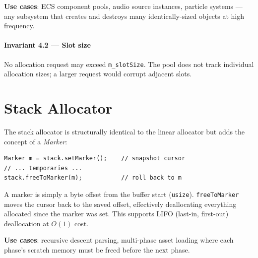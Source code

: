 \textbf{Use cases}: ECS component pools, audio source instances,
particle systems --- any subsystem that creates and destroys many
identically-sized objects at high frequency.


\paragraph{Invariant 4.2 --- Slot size}

  No allocation request may exceed \texttt{m\_slotSize}.
  The pool does not track individual allocation sizes; a larger
  request would corrupt adjacent slots.



\section{Stack Allocator}

The stack allocator is structurally identical to the linear allocator
but adds the concept of a \emph{Marker}:

\begin{lstlisting}[caption={Marker-based rollback}]
Marker m = stack.setMarker();    // snapshot cursor
// ... temporaries ...
stack.freeToMarker(m);           // roll back to m
\end{lstlisting}

A marker is simply a byte offset from the buffer start (\texttt{usize}).
\texttt{freeToMarker} moves the cursor back to the saved offset,
effectively deallocating everything allocated since the marker was set.
This supports LIFO (last-in, first-out) deallocation at $O(1)$ cost.

\textbf{Use cases}: recursive descent parsing, multi-phase asset loading
where each phase's scratch memory must be freed before the next phase.
